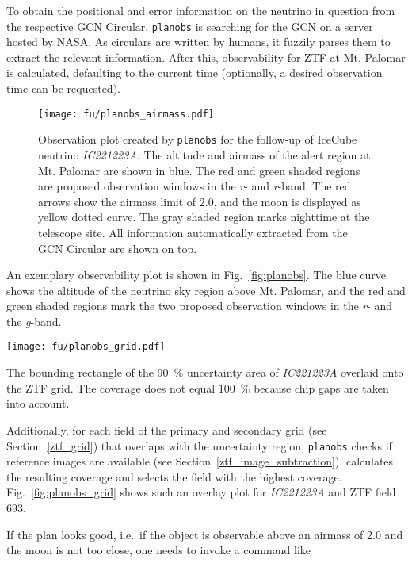 To obtain the positional and error information on the neutrino in question from the respective GCN Circular, \texttt{planobs} is searching for the GCN on a server hosted by NASA. As circulars are written by humans, it fuzzily parses them to extract the relevant information. After this, observability for ZTF at Mt. Palomar is calculated, defaulting to the current time (optionally, a desired observation time can be requested).

\begin{figure}[h!]
    \texttt{[image: fu/planobs\_airmass.pdf]}
    \caption[Observation plan]{Observation plot created by \texttt{planobs} for the follow-up of IceCube neutrino \textit{IC221223A}. The altitude and airmass of the alert region at Mt. Palomar are shown in blue. The red and green shaded regions are proposed observation windows in the \textit{r}- and \textit{r}-band. The red arrows show the airmass limit of 2.0, and the moon is displayed as yellow dotted curve. The gray shaded region marks nighttime at the telescope site. All information automatically extracted from the GCN Circular are shown on top.}
\end{figure}

An exemplary observability plot is shown in Fig.~\ref{fig:planobs}. The blue curve shows the altitude of the neutrino sky region above Mt. Palomar, and the red and green shaded regions mark the two proposed observation windows in the \textit{r}- and the \textit{g}-band.

\begin{marginfigure}
    \texttt{[image: fu/planobs\_grid.pdf]}
    \caption[\texttt{planobs} ZTF grid]{The bounding rectangle of the \SI{90}{\percent} uncertainty area of \textit{IC221223A} overlaid onto the ZTF grid. The coverage does not equal \SI{100}{\percent} because chip gaps are taken into account.}
\end{marginfigure}

Additionally, for each field of the primary and secondary grid (see Section~\ref{ztf_grid}) that overlaps with the uncertainty region, \texttt{planobs} checks if reference images are available (see Section~\ref{ztf_image_subtraction}), calculates the resulting coverage and selects the field with the highest coverage. Fig.~\ref{fig:planobs_grid} shows such an overlay plot for \textit{IC221223A} and ZTF field 693.

If the plan looks good, i.e.\ if the object is observable above an airmass of 2.0 and the moon is not too close, one needs to invoke a command like

